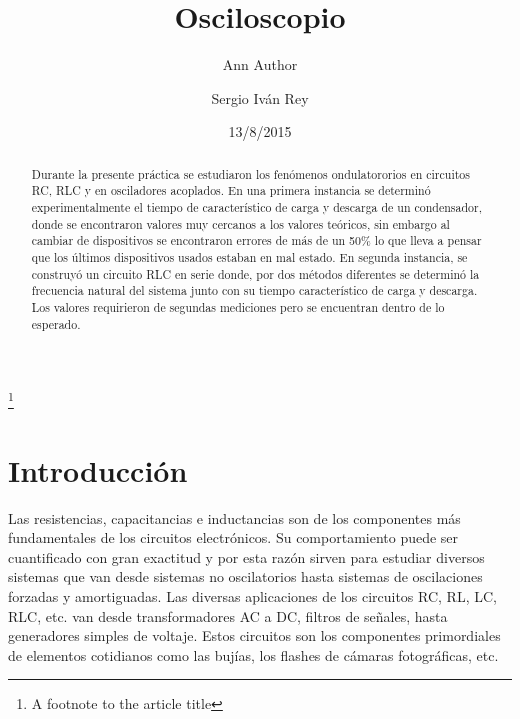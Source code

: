 \documentclass[%
 reprint,
 amsmath,amssymb,
 aps,
]{revtex4-1}
\begin{document}

\title{Osciloscopio}%
\thanks{A footnote to the article title}%

\author{Ann Author}
\author{Sergio Iv\'an Rey}%
%

\date{13/8/2015}%

\begin{abstract}
Durante la presente práctica se estudiaron los fen\'omenos ondulatororios en circuitos RC, RLC y en osciladores acoplados. En una primera instancia se determin\'o experimentalmente el tiempo de caracter\'istico de carga y descarga de un condensador, donde se encontraron valores muy cercanos a los valores te\'oricos, sin embargo al cambiar de dispositivos se encontraron errores de m\'as de un 50\% lo que lleva a pensar que los \'ultimos dispositivos usados estaban en mal estado. En segunda instancia, se construy\'o un circuito RLC en serie donde, por dos m\'etodos diferentes se determin\'o la frecuencia natural del sistema junto con su tiempo caracter\'istico de carga y descarga. Los valores requirieron de segundas mediciones pero se encuentran dentro de lo esperado.
\end{abstract}


\maketitle


\section{\label{sec:level1}Introducci\'on}

Las resistencias, capacitancias e inductancias son de los componentes m\'as fundamentales de los circuitos electr\'onicos. Su comportamiento puede ser cuantificado con gran exactitud y por esta raz\'on sirven para estudiar diversos sistemas que van desde sistemas no oscilatorios hasta sistemas de oscilaciones forzadas y amortiguadas. Las diversas aplicaciones de los circuitos RC, RL, LC, RLC, etc. van desde transformadores AC a DC, filtros de señales, hasta generadores simples de voltaje. Estos circuitos son los componentes primordiales de elementos cotidianos como las buj\'ias, los flashes de c\'amaras fotogr\'aficas, etc.\\
\end{document}
